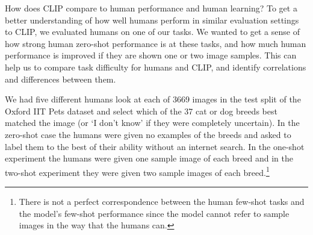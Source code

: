 \documentclass{article}
\begin{document}
How does CLIP compare to human performance and human learning? To get a better understanding of how well humans perform in similar evaluation settings to CLIP, we evaluated humans on one of our tasks. We wanted to get a sense of how strong human zero-shot performance is at these tasks, and how much human performance is improved if they are shown one or two image samples. This can help us to compare task difficulty for humans and CLIP, and identify correlations and differences between them.

We had five different humans look at each of 3669 images in the test split of the Oxford IIT Pets dataset \citep{parkhi12a} and select which of the 37 cat or dog breeds best matched the image (or `I don’t know' if they were completely uncertain). In the zero-shot case the humans were given no examples of the breeds and asked to label them to the best of their ability without an internet search. In the one-shot experiment the humans were given one sample image of each breed and in the two-shot experiment they were given two sample images of each breed.\footnote{There is not a perfect correspondence between the human few-shot tasks and the model's few-shot performance since the model cannot refer to sample images in the way that the humans can.}
\end{document}
